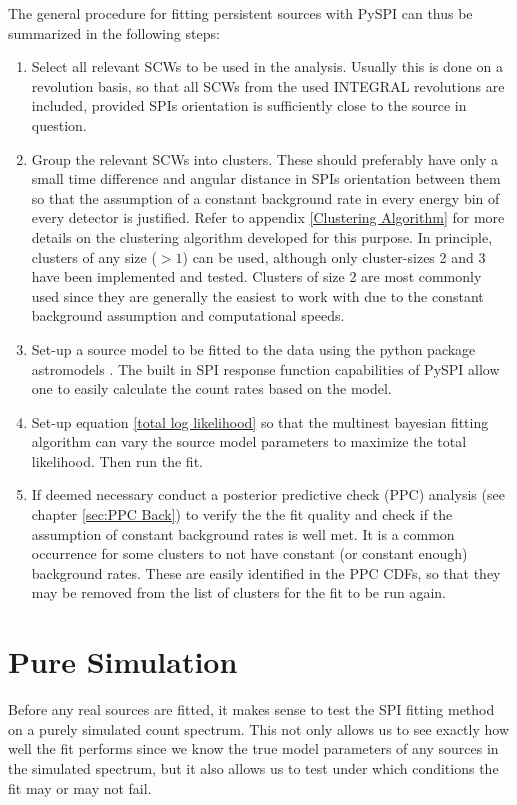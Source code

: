 \documentclass{report}
\begin{document}
The general procedure for fitting persistent sources with PySPI can thus be summarized in the following steps:
\begin{enumerate}
  \item Select all relevant SCWs to be used in the analysis. Usually this is done on a revolution basis, so that all SCWs from the used INTEGRAL revolutions are included, provided SPIs orientation is sufficiently close to the source in question.
  \item Group the relevant SCWs into clusters. These should preferably have only a small time difference and angular distance in SPIs orientation between them so that the assumption of a constant background rate in every energy bin of every detector is justified. Refer to appendix \ref{Clustering Algorithm} for more details on the clustering algorithm developed for this purpose. In principle, clusters of any size ($>1$) can be used, although only cluster-sizes 2 and 3 have been implemented and tested. Clusters of size 2 are most commonly used since they are generally the easiest to work with due to the constant background assumption and computational speeds.
  \item Set-up a source model to be fitted to the data using the python package astromodels \cite{astromodels}. The built in SPI response function capabilities of PySPI allow one to easily calculate the count rates based on the model.
  \item Set-up equation \ref{total log likelihood} so that the multinest bayesian fitting algorithm can vary the source model parameters to maximize the total likelihood. Then run the fit.
  \item If deemed necessary conduct a posterior predictive check (PPC) analysis (see chapter \ref{sec:PPC Back}) to verify the the fit quality and check if the assumption of constant background rates is well met. It is a common occurrence for some clusters to not have constant (or constant enough) background rates. These are easily identified in the PPC CDFs, so that they may be removed from the list of clusters for the fit to be run again.
\end{enumerate}



\section{Pure Simulation}\label{sec: pure sim}
Before any real sources are fitted, it makes sense to test the SPI fitting method on a purely simulated count spectrum. This not only allows us to see exactly how well the fit performs since we know the true model parameters of any sources in the simulated spectrum, but it also allows us to test under which conditions the fit may or may not fail.
\end{document}
